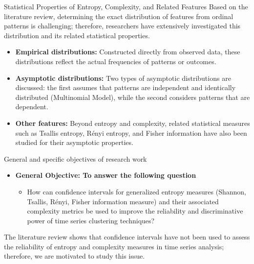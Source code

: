 \documentclass{beamer}
\begin{document}
\begin{frame}{Statistical Properties of Entropy, Complexity, and Related Features}
	Based on the literature review, determining the exact distribution of \alert{features} from ordinal patterns is challenging; therefore, researchers have extensively investigated this distribution and its related statistical properties.
	\begin{itemize}
		\item \textbf{Empirical distributions:} Constructed directly from observed data, these distributions reflect the actual frequencies of patterns or outcomes.
		\item \textbf{Asymptotic distributions:} Two types of asymptotic distributions are discussed: the first assumes that patterns are independent and identically distributed (Multinomial Model), while the second considers patterns that are dependent.
		\item \textbf{Other features:} Beyond entropy and complexity, related statistical measures such as Tsallis entropy, Rényi entropy, and Fisher information have also been studied for their asymptotic properties.
	\end{itemize}
\end{frame}



\begin{frame}{General and specific objectives of research work}
	\begin{itemize}
		\item \textbf{General Objective: To answer the following question}
		\begin{itemize}
			\item How can confidence intervals for generalized entropy measures (Shannon, Tsallis, Rényi, Fisher information measure) and their associated complexity metrics be used to improve the 
			reliability and discriminative power of time series clustering techniques?
		\end{itemize}
	\end{itemize}		
		
The literature review shows that confidence intervals have not been used to assess the reliability of entropy and complexity measures in time series analysis; therefore, we are motivated to study this issue.
\end{frame}
\end{document}
